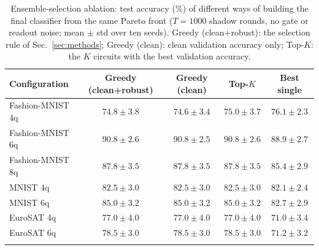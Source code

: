 \begin{table}[t]
\caption{Ensemble-selection ablation: test accuracy (\%) of different ways of building the final classifier from the same Pareto front ($T=1000$ shadow rounds, no gate or readout noise; mean $\pm$ std over ten seeds). Greedy (clean+robust): the selection rule of Sec.~\ref{sec:methods}; Greedy (clean): clean validation accuracy only; Top-$K$: the $K$ circuits with the best validation accuracy.}\label{tab:ensemble}
\footnotesize
\begin{tabular}{@{}lcccc@{}}
\toprule
Configuration & Greedy (clean+robust) & Greedy (clean) & Top-$K$ & Best single \\
\midrule
Fashion-MNIST 4q & $74.8\pm3.8$ & $74.6\pm3.4$ & $75.0\pm3.7$ & $76.1\pm2.3$ \\
Fashion-MNIST 6q & $90.8\pm2.6$ & $90.8\pm2.5$ & $90.8\pm2.6$ & $88.9\pm2.7$ \\
Fashion-MNIST 8q & $87.8\pm3.5$ & $87.8\pm3.5$ & $87.8\pm3.5$ & $85.4\pm2.9$ \\
MNIST 4q & $82.5\pm3.0$ & $82.5\pm3.0$ & $82.5\pm3.0$ & $82.1\pm2.4$ \\
MNIST 6q & $85.0\pm3.2$ & $85.0\pm3.2$ & $85.0\pm3.2$ & $82.7\pm2.9$ \\
EuroSAT 4q & $77.0\pm4.0$ & $77.0\pm4.0$ & $77.0\pm4.0$ & $71.0\pm3.4$ \\
EuroSAT 6q & $78.5\pm3.0$ & $78.5\pm3.0$ & $78.5\pm3.0$ & $71.2\pm3.2$ \\
\botrule
\end{tabular}
\end{table}
